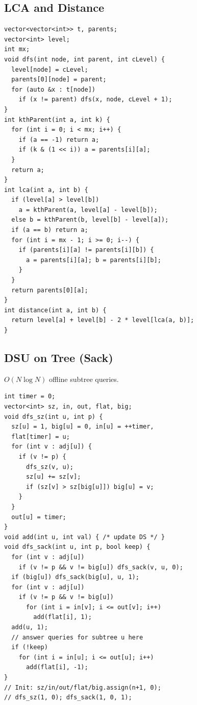 \subsection{LCA and Distance}
\begin{verbatim}
vector<vector<int>> t, parents;
vector<int> level;
int mx;
void dfs(int node, int parent, int cLevel) {
  level[node] = cLevel;
  parents[0][node] = parent;
  for (auto &x : t[node])
    if (x != parent) dfs(x, node, cLevel + 1);
}
int kthParent(int a, int k) {
  for (int i = 0; i < mx; i++) {
    if (a == -1) return a;
    if (k & (1 << i)) a = parents[i][a];
  }
  return a;
}
int lca(int a, int b) {
  if (level[a] > level[b])
    a = kthParent(a, level[a] - level[b]);
  else b = kthParent(b, level[b] - level[a]);
  if (a == b) return a;
  for (int i = mx - 1; i >= 0; i--) {
    if (parents[i][a] != parents[i][b]) {
      a = parents[i][a]; b = parents[i][b];
    }
  }
  return parents[0][a];
}
int distance(int a, int b) {
  return level[a] + level[b] - 2 * level[lca(a, b)];
}
\end{verbatim}
\subsection{DSU on Tree (Sack)}
$O(N \log N)$ offline subtree queries.
\begin{verbatim}
int timer = 0;
vector<int> sz, in, out, flat, big;
void dfs_sz(int u, int p) {
  sz[u] = 1, big[u] = 0, in[u] = ++timer,
  flat[timer] = u;
  for (int v : adj[u]) {
    if (v != p) {
      dfs_sz(v, u);
      sz[u] += sz[v];
      if (sz[v] > sz[big[u]]) big[u] = v;
    }
  }
  out[u] = timer;
}
void add(int u, int val) { /* update DS */ }
void dfs_sack(int u, int p, bool keep) {
  for (int v : adj[u])
    if (v != p && v != big[u]) dfs_sack(v, u, 0);
  if (big[u]) dfs_sack(big[u], u, 1);
  for (int v : adj[u])
    if (v != p && v != big[u])
      for (int i = in[v]; i <= out[v]; i++)
        add(flat[i], 1);
  add(u, 1);
  // answer queries for subtree u here
  if (!keep)
    for (int i = in[u]; i <= out[u]; i++)
      add(flat[i], -1);
}
// Init: sz/in/out/flat/big.assign(n+1, 0);
// dfs_sz(1, 0); dfs_sack(1, 0, 1);
\end{verbatim}
